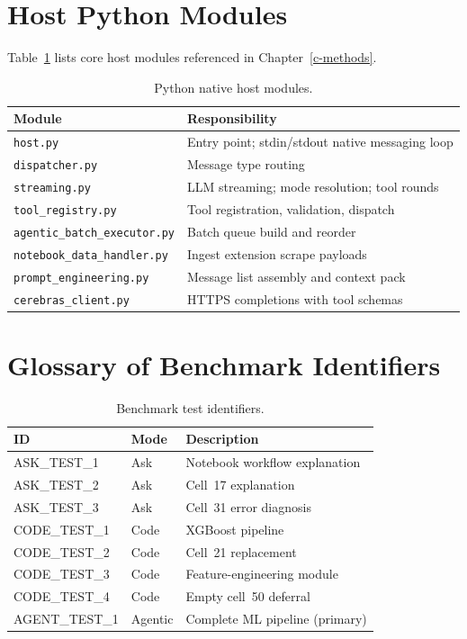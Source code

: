 \section{Host Python Modules}
\label{app:host-modules}

Table~\ref{tab:app-host} lists core host modules referenced in Chapter~\ref{c-methods}.

\begin{table}[!ht]
\centering
\caption{Python native host modules.}
\label{tab:app-host}
\small
\begin{tabular}{|p{4.4cm}|p{8.2cm}|}
\hline
\textbf{Module} & \textbf{Responsibility} \\ \hline
\texttt{host.py} & Entry point; stdin/stdout native messaging loop \\ \hline
\texttt{dispatcher.py} & Message type routing \\ \hline
\texttt{streaming.py} & LLM streaming; mode resolution; tool rounds \\ \hline
\texttt{tool\_registry.py} & Tool registration, validation, dispatch \\ \hline
\texttt{agentic\_batch\_executor.py} & Batch queue build and reorder \\ \hline
\texttt{notebook\_data\_handler.py} & Ingest extension scrape payloads \\ \hline
\texttt{prompt\_engineering.py} & Message list assembly and context pack \\ \hline
\texttt{cerebras\_client.py} & HTTPS completions with tool schemas \\ \hline
\end{tabular}
\end{table}

\section{Glossary of Benchmark Identifiers}
\label{app:ids}

\begin{table}[!ht]
\centering
\caption{Benchmark test identifiers.}
\label{tab:app-ids}
\small
\begin{tabular}{|l|l|p{6.8cm}|}
\hline
\textbf{ID} & \textbf{Mode} & \textbf{Description} \\ \hline
ASK\_TEST\_1 & Ask & Notebook workflow explanation \\ \hline
ASK\_TEST\_2 & Ask & Cell~17 explanation \\ \hline
ASK\_TEST\_3 & Ask & Cell~31 error diagnosis \\ \hline
CODE\_TEST\_1 & Code & XGBoost pipeline \\ \hline
CODE\_TEST\_2 & Code & Cell~21 replacement \\ \hline
CODE\_TEST\_3 & Code & Feature-engineering module \\ \hline
CODE\_TEST\_4 & Code & Empty cell~50 deferral \\ \hline
AGENT\_TEST\_1 & Agentic & Complete ML pipeline (primary) \\ \hline
\end{tabular}
\end{table}

